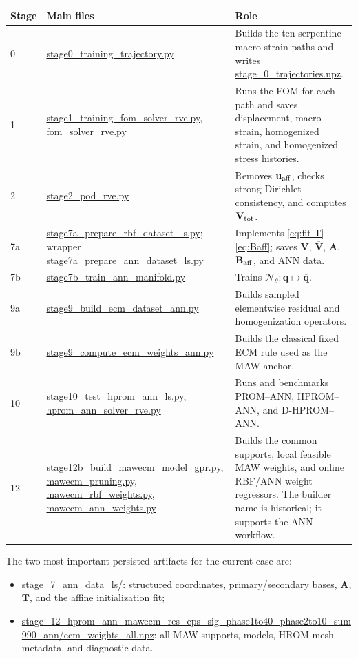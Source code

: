 \documentclass[11pt,a4paper]{article}
\newcommand{\vect}[1]{\mathbf{#1}}
\newcommand{\mat}[1]{\mathbf{#1}}
\newcommand{\code}[1]{\url{#1}}
\begin{document}
\begin{longtable}{@{}p{16mm}p{48mm}p{90mm}@{}}
\toprule
Stage & Main files & Role \\
\midrule
\endhead
0 & \code{stage0_training_trajectory.py} & Builds the ten serpentine macro-strain paths and writes \code{stage_0_trajectories.npz}. \\
1 & \code{stage1_training_fom_solver_rve.py}, \code{fom_solver_rve.py} & Runs the FOM for each path and saves displacement, macro-strain, homogenized strain, and homogenized stress histories. \\
2 & \code{stage2_pod_rve.py} & Removes \(\vect u_{\rm aff}\), checks strong Dirichlet consistency, and computes \(\mat V_{\rm tot}\). \\
7a & \code{stage7a_prepare_rbf_dataset_ls.py}; wrapper \code{stage7a_prepare_ann_dataset_ls.py} & Implements \cref{eq:fit-T}--\cref{eq:Baff}; saves \(\mat V\), \(\overline{\mat V}\), \(\mat A\), \(\mat B_{\rm aff}\), and ANN data. \\
7b & \code{stage7b_train_ann_manifold.py} & Trains \(\mathcal N_\theta:\vect q\mapsto\overline{\vect q}\). \\
9a & \code{stage9_build_ecm_dataset_ann.py} & Builds sampled elementwise residual and homogenization operators. \\
9b & \code{stage9_compute_ecm_weights_ann.py} & Builds the classical fixed ECM rule used as the MAW anchor. \\
10 & \code{stage10_test_hprom_ann_ls.py}, \code{hprom_ann_solver_rve.py} & Runs and benchmarks PROM--ANN, HPROM--ANN, and D-HPROM--ANN. \\
12 & \code{stage12b_build_mawecm_model_gpr.py}, \code{mawecm_pruning.py}, \code{mawecm_rbf_weights.py}, \code{mawecm_ann_weights.py} & Builds the common supports, local feasible MAW weights, and online RBF/ANN weight regressors.  The builder name is historical; it supports the ANN workflow. \\
\bottomrule
\end{longtable}

The two most important persisted artifacts for the current case are:
\begin{itemize}[leftmargin=7mm]
  \item \code{stage_7_ann_data_ls/}: structured coordinates,
  primary/secondary bases, \(\mat A\), \(\mat T\), and the affine
  initialization fit;
  \item \code{stage_12_hprom_ann_mawecm_res_eps_sig_phase1to40_phase2to10_sum990_ann/ecm_weights_all.npz}:
  all MAW supports, models, HROM mesh metadata, and diagnostic data.
\end{itemize}
\end{document}
